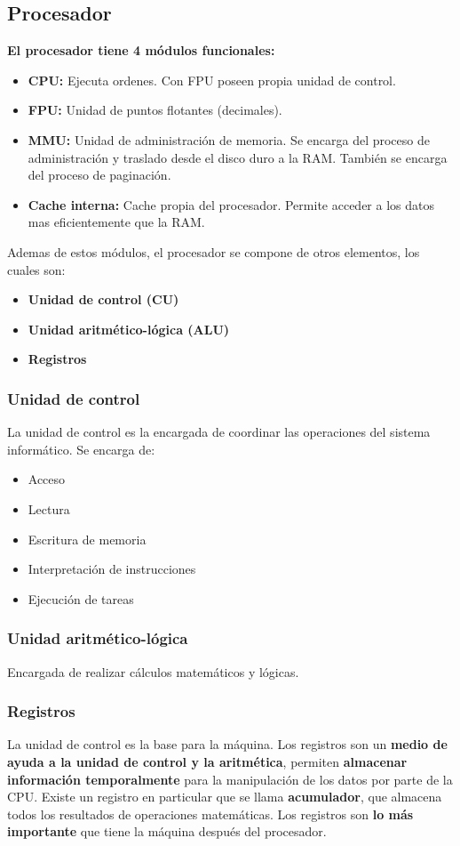 \documentclass{templateNote}
\begin{document}
\subsection{Procesador}
\noindent \textbf{El procesador tiene 4 módulos funcionales:}
\begin{itemize}
    \item \textbf{CPU:} Ejecuta ordenes. Con FPU poseen propia unidad de control.
    \item \textbf{FPU:} Unidad de puntos flotantes (decimales).
    \item \textbf{MMU:} Unidad de administración de memoria. Se encarga del proceso de administración y traslado desde el disco duro a la RAM. 
                        También se encarga del proceso de paginación.
    \item \textbf{Cache interna:} Cache propia del procesador. Permite acceder a los datos mas eficientemente que la RAM.
\end{itemize}

\noindent Ademas de estos módulos, el procesador se compone de otros elementos, los cuales son:
\begin{itemize}
    \item \textbf{Unidad de control (CU)}
    \item \textbf{Unidad aritmético-lógica (ALU)}
    \item \textbf{Registros}
\end{itemize}

\subsubsection{Unidad de control}
\noindent La unidad de control es la encargada de coordinar las operaciones del sistema informático. Se encarga de:
\begin{itemize}
    \item Acceso
    \item Lectura
    \item Escritura de memoria
    \item Interpretación de instrucciones
    \item Ejecución de tareas
\end{itemize}
\subsubsection{Unidad aritmético-lógica}
\noindent Encargada de realizar cálculos matemáticos y lógicas.
\subsubsection{Registros}
\noindent La unidad de control es la base para la máquina. Los registros son un \textbf{medio de ayuda a la unidad de control y la aritmética}, 
permiten \textbf{almacenar información temporalmente} para la manipulación de los datos por parte de la CPU. Existe un registro en particular 
que se llama \textbf{acumulador}, que almacena todos los resultados de operaciones matemáticas. Los registros son \textbf{lo más importante} 
que tiene la máquina después del procesador.
\end{document}
